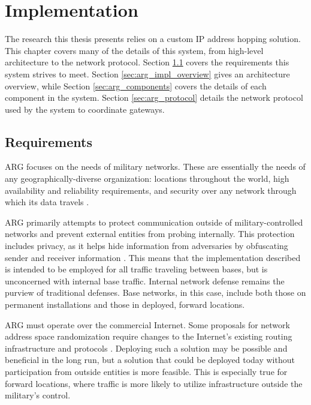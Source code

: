 \chapter{Implementation}
\label{chp:implementation}

\par The research this thesis presents relies on a custom \ac{IP} address hopping solution. This chapter covers many of the details of this system, from high-level architecture to the network protocol. Section \ref{sec:arg_requirements} covers the requirements this system strives to meet. Section \ref{sec:arg_impl_overview} gives an architecture overview, while Section \ref{sec:arg_components} covers the details of each component in the system. Section \ref{sec:arg_protocol} details the network protocol used by the system to coordinate gateways.

\section{Requirements}
\label{sec:arg_requirements}
\par \ac{ARG} focuses on the needs of military networks. These are essentially the needs of any geographically-diverse organization: locations throughout the world, high availability and reliability requirements, and security over any network through which its data travels \cite{DialInNetworking}.

\par ARG primarily attempts to protect communication outside of military-controlled networks and prevent external entities from probing internally. This protection includes privacy, as it helps hide information from adversaries by obfuscating sender and receiver information \cite{NetworkBasedPrivacy}. This means that the implementation described is intended to be employed for all traffic traveling between bases, but is unconcerned with internal base traffic. Internal network defense remains the purview of traditional defenses. Base networks, in this case, include both those on permanent installations and those in deployed, forward locations. 

\par ARG must operate over the commercial Internet. Some proposals for network address space randomization require changes to the Internet's existing routing infrastructure and protocols \cite{CONTRA, APOD}. Deploying such a solution may be possible and beneficial in the long run, but a solution that could be deployed today without participation from outside entities is more feasible. This is especially true for forward locations, where traffic is more likely to utilize infrastructure outside the military's control.

